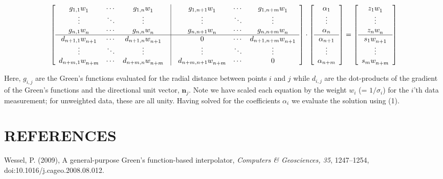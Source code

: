 \documentclass[12pt,letterpaper,margin=0.5in]{report}
\begin{document}
\[
\left[ {\begin{array}{*{20}{c}}
{{g_{1,1}}w_1^{}}& \cdots &{{g_{1,n}}w_1^{}}&\vline& {{g_{1,n + 1}}w_1^{}}& \cdots &{{g_{1,n + m}}w_1^{}}\\
 \vdots & \ddots & \vdots &\vline&  \vdots & \ddots & \vdots \\
{{g_{n,1}}w_n^{}}& \cdots &{{g_{n,n}}w_n^{}}&\vline& {{g_{n,n + 1}}w_n^{}}& \cdots &{{g_{n,n + m}}w_n^{}}\\
\hline
{{d_{n + 1,1}}w_{n + 1}^{}}& \cdots &{{d_{n + 1,n}}w_{n + 1}^{}}&\vline& 0& \cdots &{{d_{n + 1,n + m}}w_{n + 1}^{}}\\
 \vdots & \ddots & \vdots &\vline&  \vdots & \ddots & \vdots \\
{{d_{n + m,1}}w_{n + m}^{}}& \cdots &{{d_{n + m,n}}w_{n + m}^{}}&\vline& {{d_{n + m,n + 1}}w_{n + m}^{}}& \cdots &0
\end{array}} \right] \cdot \left[ {\begin{array}{*{20}{c}}
{{\alpha _1}}\\
 \vdots \\
{{\alpha _n}}\\
\hline
{{\alpha _{n + 1}}}\\
 \vdots \\
{{\alpha _{n + m}}}
\end{array}} \right] = \left[ {\begin{array}{*{20}{c}}
{{z_1}w_1^{}}\\
 \vdots \\
{{z_n}w_n^{}}\\
\hline
{{s_1}w_{n + 1}^{}}\\
 \vdots \\
{{s_m}w_{n + m}^{}}
\end{array}} \right]
\]

Here, $g_{i,j}$ are the Green’s functions evaluated for the radial distance between points $i$ and $j$
while $d_{i,j}$ are the dot-products of the gradient of the Green's functions and the directional unit vector, ${\mathbf n}_j$.
Note we have scaled each equation by the weight $w_i$
(= $1/\sigma_i$) for the $i$’th data measurement; for unweighted data, these are all unity.
Having solved for the coefficients $\alpha_i$ we evaluate the solution using (1).

\section{REFERENCES}

Wessel, P. (2009), A general-purpose Green's function-based interpolator, {\it Computers \& Geosciences, 35}, 1247--1254, doi:10.1016/j.cageo.2008.08.012.
\end{document}
